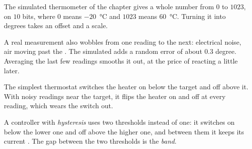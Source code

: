 The simulated thermometer of the chapter gives a whole number from $0$ to $1023$, on $10$ bits, where $0$ means
$-20$~°C and $1023$ means $60$~°C. Turning it into degrees takes an offset and a scale.

\label{lst:g10:sensors-actuators-control:convert}

\label{out:g10:sensors-actuators-control:convert}

A real measurement also wobbles from one reading to the next: electrical noise, air moving past the . The
simulated  adds a random error of about $0.3$ degree. Averaging the last few readings smooths it out, at the
price of reacting a little later.

\label{lst:g10:sensors-actuators-control:smooth}

\label{out:g10:sensors-actuators-control:smooth}

The simplest thermostat switches the heater on below the target and off above it. With noisy readings near the
target, it flips the heater on and off at every reading, which wears the switch out.

\begin{definition}[Hysteresis]\label{def:g10:sensors-actuators-control:hysteresis}
A controller with \emph{hysteresis} uses two thresholds instead of one: it switches on below the
lower one and off above the higher one, and between them it keeps its current . The gap between the two
thresholds is the \emph{band}.
\end{definition}

\label{lst:g10:sensors-actuators-control:thermostat}

